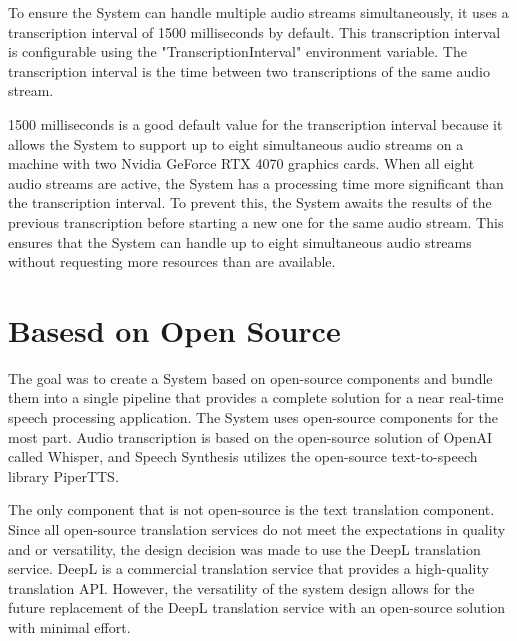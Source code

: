 To ensure the System can handle multiple audio streams simultaneously, it uses a transcription interval of 1500 
milliseconds by default. This transcription interval is configurable using the "TranscriptionInterval" environment 
variable. The transcription interval is the time between two transcriptions of the same audio stream.

1500 milliseconds is a good default value for the transcription interval because it allows the System to support up to 
eight simultaneous audio streams on a machine with two Nvidia GeForce RTX 4070 graphics cards. When all eight audio 
streams are active, the System has a processing time more significant than the transcription interval. To prevent this, 
the System awaits the results of the previous transcription before starting a new one for the same audio stream. This 
ensures that the System can handle up to eight simultaneous audio streams without requesting more resources than are 
available.


\section{Basesd on Open Source}

The goal was to create a System based on open-source components and bundle them into a single pipeline that provides a 
complete solution for a near real-time speech processing application. The System uses open-source components for the 
most part. Audio transcription is based on the open-source solution of OpenAI called Whisper, and Speech Synthesis 
utilizes the open-source text-to-speech library PiperTTS.

The only component that is not open-source is the text translation component. Since all open-source translation 
services do not meet the expectations in quality and or versatility, the design decision was made to use the DeepL 
translation service. DeepL is a commercial translation service that provides a high-quality translation API. However, 
the versatility of the system design allows for the future replacement of the DeepL translation service with an 
open-source solution with minimal effort.
